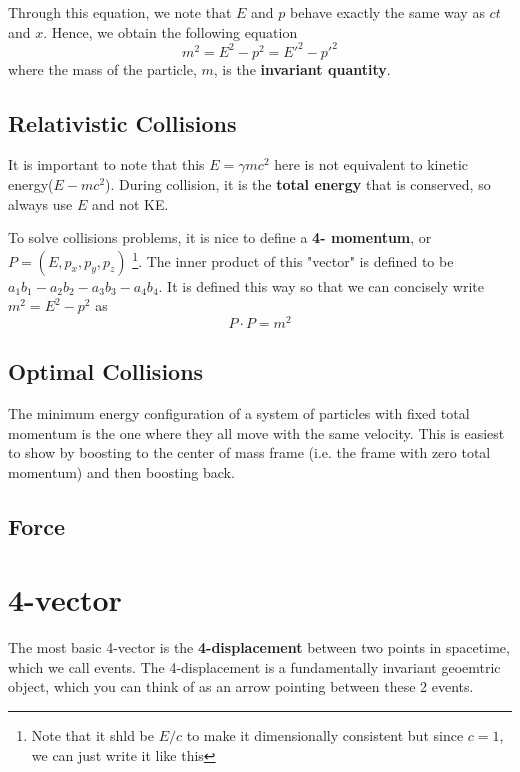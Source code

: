 Through this equation, we note that $E$ and $p$ behave exactly the same way as $ct$ and $x$. Hence, we obtain the following equation
\begin{equation}
    m^2=E^2-p^2=E'^2-p'^2
\end{equation}
where the mass of the particle, $m$, is the \textbf{invariant quantity}.

\subsection{Relativistic Collisions}
It is important to note that this $E=\gamma mc^2$ here is not equivalent to kinetic energy($E-mc^2$). During collision, it is the \textbf{total energy} that is conserved, so always use $E$ and not KE. 

To solve collisions problems, it is nice to define a \textbf{4- momentum}, or $P=(E,p_x,p_y,p_z)$ \footnote{Note that it shld be $E/c$ to make it dimensionally consistent but since $c=1$, we can just write it like this}. The inner product of this "vector" is defined to be $a_1b_1-a_2b_2-a_3b_3-a_4b_4$. It is defined this way so that we can concisely write $m^2=E^2-p^2$ as 
\begin{equation}
    P\cdot P=m^2
\end{equation}

\subsection{Optimal Collisions}
The minimum energy configuration of a system of particles with fixed total momentum is the one where they all move with the same velocity. This is easiest to show by boosting to the center of mass frame (i.e. the frame with zero total momentum) and then boosting back.


\subsection{Force}






\section{4-vector}
The most basic 4-vector is the \textbf{4-displacement} between two points in spacetime, which we call events. The 4-displacement is a fundamentally invariant geoemtric object, which you can think of as an arrow pointing between these 2 events. 

